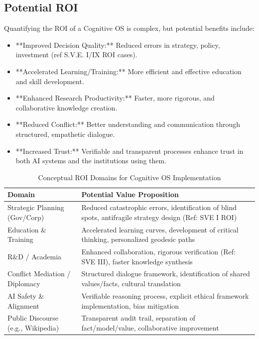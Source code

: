 \documentclass[11pt,a4paper]{article}
\theoremstyle{definition}
\theoremstyle{remark}
\begin{document}
\begin{itemize}
\begin{itemize}
\subsection{Potential ROI}
Quantifying the ROI of a Cognitive OS is complex, but potential benefits include:
\begin{itemize}
    \item **Improved Decision Quality:** Reduced errors in strategy, policy, investment (ref S.V.E. I/IX ROI cases).
    \item **Accelerated Learning/Training:** More efficient and effective education and skill development.
    \item **Enhanced Research Productivity:** Faster, more rigorous, and collaborative knowledge creation.
    \item **Reduced Conflict:** Better understanding and communication through structured, empathetic dialogue.
    \item **Increased Trust:** Verifiable and transparent processes enhance trust in both AI systems and the institutions using them.
\end{itemize}

\begin{table}[h]
\centering
\caption{Conceptual ROI Domains for Cognitive OS Implementation}
\begin{tabular}{|l|p{8cm}|}
\hline
\textbf{Domain} & \textbf{Potential Value Proposition} \\
\hline
Strategic Planning (Gov/Corp) & Reduced catastrophic errors, identification of blind spots, antifragile strategy design (Ref: SVE I ROI) \\
Education \& Training & Accelerated learning curves, development of critical thinking, personalized geodesic paths \\
R\&D / Academia & Enhanced collaboration, rigorous verification (Ref: SVE III), faster knowledge synthesis \\
Conflict Mediation / Diplomacy & Structured dialogue framework, identification of shared values/facts, cultural translation \\
AI Safety \& Alignment & Verifiable reasoning process, explicit ethical framework implementation, bias mitigation \\
Public Discourse (e.g., Wikipedia) & Transparent audit trail, separation of fact/model/value, collaborative improvement \\
\hline
\end{tabular}
\end{table}


\end{itemize}
\end{itemize}
\end{document}
